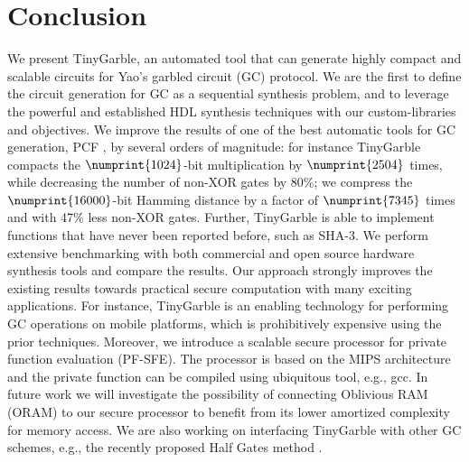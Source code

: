 \chapter{Conclusion}
We present TinyGarble, an automated tool that can generate highly compact and scalable circuits for Yao's garbled circuit (GC) protocol.
We are the first to define the circuit generation for GC as a sequential synthesis problem, and to leverage the powerful and established HDL synthesis techniques with our custom-libraries and objectives.
We improve the results of one of the best automatic tools for GC generation, PCF \cite{kreuter2013pcf}, by several orders of magnitude: for instance TinyGarble compacts the $\numprint{1024}$-bit multiplication by $\numprint{2504}$ times, while decreasing the number of non-XOR gates by 80\%; we compress the $\numprint{16000}$-bit Hamming distance by a factor of $\numprint{7345}$ times and with 47\% less non-XOR gates.
Further, TinyGarble is able to implement functions that have never been reported before, such as SHA-3.
We perform extensive benchmarking with both commercial and open source hardware synthesis tools and compare the results.
Our approach strongly improves the existing results towards practical secure computation with many exciting applications.
For instance, TinyGarble is an enabling technology for performing GC operations on mobile platforms, which is prohibitively expensive using the prior techniques.
Moreover, we introduce a scalable secure processor for private function evaluation (PF-SFE).
The processor is based on the MIPS architecture and the private function can be compiled using ubiquitous tool, e.g., gcc.
In future work we will investigate the possibility of connecting Oblivious RAM (ORAM) to our secure processor to benefit from its lower amortized complexity for memory access.
We are also working on interfacing TinyGarble with other GC schemes, e.g., the recently proposed Half Gates method \cite{zahur2015two}.
